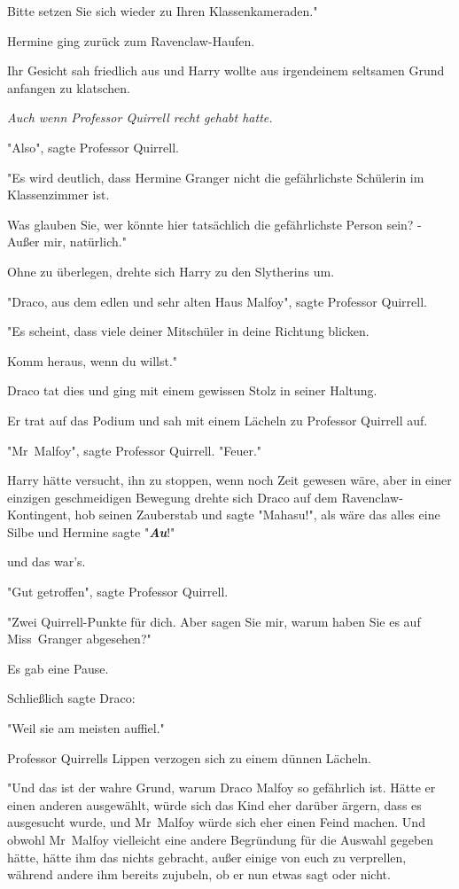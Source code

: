 {Bitte setzen Sie sich wieder zu Ihren Klassenkameraden."

Hermine ging zurück zum Ravenclaw-Haufen.

Ihr Gesicht sah friedlich aus und Harry wollte aus irgendeinem seltsamen Grund anfangen zu klatschen.

\emph{Auch wenn Professor Quirrell recht gehabt hatte.}

"Also", sagte Professor Quirrell.

"Es wird deutlich, dass Hermine Granger nicht die gefährlichste Schülerin im Klassenzimmer ist.

Was glauben Sie, wer könnte hier tatsächlich die gefährlichste Person sein? - Außer mir, natürlich."

Ohne zu überlegen, drehte sich Harry zu den Slytherins um.

"Draco, aus dem edlen und sehr alten Haus Malfoy", sagte Professor Quirrell.

"Es scheint, dass viele deiner Mitschüler in deine Richtung blicken.

Komm heraus, wenn du willst."

Draco tat dies und ging mit einem gewissen Stolz in seiner Haltung.

Er trat auf das Podium und sah mit einem Lächeln zu Professor Quirrell auf.

"Mr~Malfoy", sagte Professor Quirrell. "Feuer."

Harry hätte versucht, ihn zu stoppen, wenn noch Zeit gewesen wäre, aber in einer einzigen geschmeidigen Bewegung drehte sich Draco auf dem Ravenclaw-Kontingent, hob seinen Zauberstab und sagte "Mahasu!", als wäre das alles eine Silbe und Hermine sagte "\textbf{\emph{Au}}!"

und das war's.

"Gut getroffen", sagte Professor Quirrell.

"Zwei Quirrell-Punkte für dich. Aber sagen Sie mir, warum haben Sie es auf Miss~Granger abgesehen?"

Es gab eine Pause.

Schließlich sagte Draco:

"Weil sie am meisten auffiel."

Professor Quirrells Lippen verzogen sich zu einem dünnen Lächeln.

"Und das ist der wahre Grund, warum Draco Malfoy so gefährlich ist. Hätte er einen anderen ausgewählt, würde sich das Kind eher darüber ärgern, dass es ausgesucht wurde, und Mr~Malfoy würde sich eher einen Feind machen. Und obwohl Mr~Malfoy vielleicht eine andere Begründung für die Auswahl gegeben hätte, hätte ihm das nichts gebracht, außer einige von euch zu verprellen, während andere ihm bereits zujubeln, ob er nun etwas sagt oder nicht.

}
